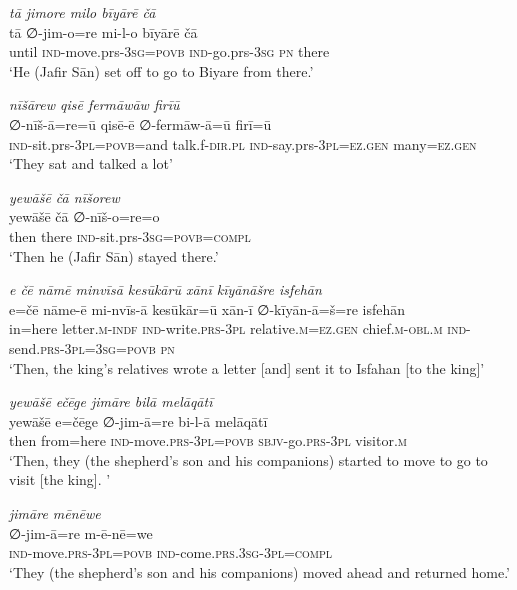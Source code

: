 \ea \label{ŠJ.80}
\textit{tā jimore milo bīyārē čā} \\ 
\gll tā ∅-jim-o=re mi-l-o bīyārē čā \\ 
 until \textsc{ind-}move.prs\textsc{-3sg}\textsc{=\textsc{povb}} \textsc{ind-}go.prs\textsc{-3sg} \textsc{pn} there \\ 
\glt `He (Jafir Sān) set off to go to Biyare from there.'
\z 
 
\ea \label{ŠJ.85}
\textit{nīšārew qisē fermāwāw firīū} \\ 
\gll ∅-nīš-ā=re=ū qisē-ē ∅-fermāw-ā=ū firī=ū \\ 
 \textsc{ind-}sit.prs\textsc{-3pl}\textsc{=\textsc{povb}}=and talk.f\textsc{-dir}\textsc{.pl} \textsc{ind-}say.prs\textsc{-3pl}\textsc{=ez.gen} many\textsc{=ez.gen} \\ 
\glt `They sat and talked a lot'
\z 
 
\ea \label{ŠJ.93}
\textit{yewāšē čā nīšorew} \\ 
\gll yewāšē čā ∅-nīš-o=re=o \\ 
 then there \textsc{ind-}sit.prs\textsc{-3sg}\textsc{=\textsc{povb}}\textsc{=compl} \\ 
\glt `Then he (Jafir Sān) stayed there.'
\z 
 
\ea \label{KŠ.50}
\textit{e čē nāmē minvīsā kesūkārū xānī kīyānāšre isfehān} \\ 
\gll e=čē nāme-ē mi-nvīs-ā kesūkār=ū xān-ī ∅-kīyān-ā=š=re isfehān \\ 
 in=here letter\textsc{.m}\textsc{-indf} \textsc{ind-}write\textsc{.prs}\textsc{-3pl} relative\textsc{.m}\textsc{=ez.gen} chief\textsc{.m}\textsc{-obl}\textsc{.m} \textsc{ind-}send\textsc{.prs}\textsc{-3pl}\textsc{=3sg}\textsc{=\textsc{povb}} \textsc{pn} \\ 
\glt `Then, the king’s relatives wrote a letter [and] sent it to Isfahan [to the king]'
\z 
 
\ea \label{KŠ.53}
\textit{yewāšē ečēge jimāre bilā melāqātī} \\ 
\gll yewāšē e=čēge ∅-jim-ā=re bi-l-ā melāqātī \\ 
 then from=here \textsc{ind-}move\textsc{.prs}\textsc{-3pl}\textsc{=\textsc{povb}} \textsc{sbjv-}go\textsc{.prs}\textsc{-3pl} visitor\textsc{.m} \\ 
\glt `Then, they (the shepherd's son and his companions) started to move to go to visit [the king]. '
\z 
 
\ea \label{KŠ.58}
\textit{jimāre mēnēwe} \\ 
\gll ∅-jim-ā=re m-ē-nē=we \\ 
 \textsc{ind-}move\textsc{.prs}\textsc{-3pl}\textsc{=\textsc{povb}} \textsc{ind-}come\textsc{.prs}\textsc{.3sg}\textsc{-3pl}\textsc{=compl} \\ 
\glt `They (the shepherd’s son and his companions) moved ahead and returned home.'
\z 
 
